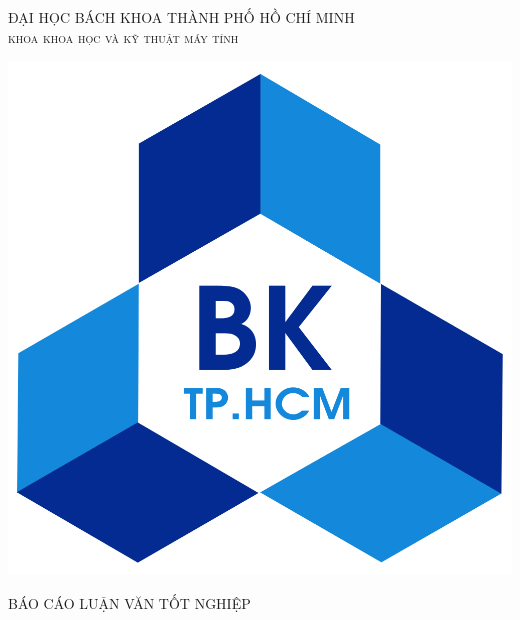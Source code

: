 \begin{titlepage}

\newcommand{\HRule}{\rule{\linewidth}{0.5mm}} %
\newcommand\tab[1][1cm]{\hspace*{#1}}

\center %
 

\textsc{\large ĐẠI HỌC BÁCH KHOA THÀNH PHỐ HỒ CHÍ MINH}\\[0.2cm] %
\textsc{\Large \scshape khoa khoa học và kỹ thuật máy tính}\\[0.5cm] %
\begin{center}
    \includegraphics[scale=.14]{image/logo}
\end{center}

\textsc{\large BÁO CÁO LUẬN VĂN TỐT NGHIỆP}\\[0.2cm] %



\end{titlepage}

